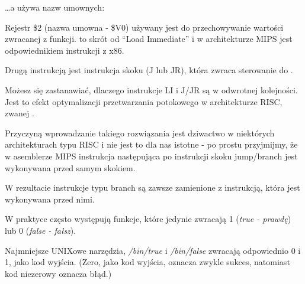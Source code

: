 \dots a \IDA używa nazw umownych:



Rejestr \$2 (nazwa umowna - \$V0) używany jest do przechowywanie wartości zwracanej z funkcji.
 to skrót od ``Load Immediate'' i w architekturze MIPS jest odpowiednikiem instrukcji \MOV z x86.

Drugą instrukcją jest instrukcja skoku (J lub JR), która zwraca sterowanie do .

Możesz się zastanawiać, dlaczego instrukcje LI i J/JR są w odwrotnej kolejności.
Jest to efekt optymalizacji przetwarzania potokowego w architekturze \ac{RISC}, zwanej .

Przyczyną wprowadzanie takiego rozwiązania jest dziwactwo w niektórych architekturach typu RISC
i nie jest to dla nas istotne - po prostu przyjmijmy, że w asemblerze MIPS instrukcja następująca po instrukcji skoku jump/branch
jest wykonywana przed samym skokiem.

W rezultacie instrukcje typu branch są zawsze zamienione z instrukcją, która jest wykonywana przed nimi.

W praktyce często występują funkcje, które jedynie zwracają 1 (\emph{true - prawdę}) lub 0 (\emph{false - fałsz}).

Najmniejsze UNIXowe narzędzia, \emph{/bin/true} i \emph{/bin/false} zwracają odpowiednio 0 i 1, jako kod wyjścia.
(Zero, jako kod wyjścia, oznacza zwykle sukces, natomiast kod niezerowy oznacza błąd.)
